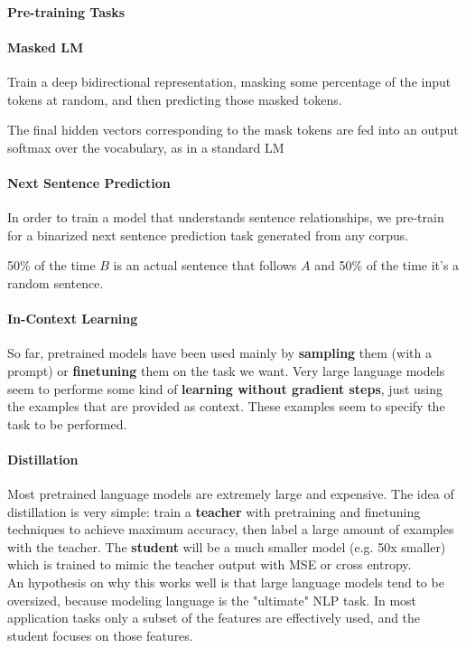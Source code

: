 \documentclass[10pt]{report}
\begin{document}
\paragraph{Pre-training Tasks}
\begin{multicols}{2}
	\paragraph{Masked LM}\begin{list}{}{}
		\item Train a deep bidirectional representation, masking some percentage of the input tokens at random, and then predicting those masked tokens.
		\item The final hidden vectors corresponding to the mask tokens are fed into an output softmax over the vocabulary, as in a standard LM
	\end{list}
	\columnbreak
	\paragraph{Next Sentence Prediction}\begin{list}{}{}
		\item In order to train a model that understands sentence relationships, we pre-train for a binarized next sentence prediction task generated from any corpus.
		\item 50\% of the time $B$ is an actual sentence that follows $A$ and 50\% of the time it's a random sentence.
	\end{list}
\end{multicols}
\paragraph{In-Context Learning} So far, pretrained models have been used mainly by \textbf{sampling} them (with a prompt) or \textbf{finetuning} them on the task we want. Very large language models seem to performe some kind of \textbf{learning without gradient steps}, just using the examples that are provided as context. These examples seem to specify the task to be performed.
\paragraph{Distillation} Most pretrained language models are extremely large and expensive. The idea of distillation is very simple: train a \textbf{teacher} with pretraining and finetuning techniques to achieve maximum accuracy, then label a large amount of examples with the teacher. The \textbf{student} will be a much smaller model (e.g. 50x smaller) which is trained to mimic the teacher output with MSE or cross entropy.\\
An hypothesis on why this works well is that large language models tend to be oversized, because modeling language is the "ultimate" NLP task. In most application tasks only a subset of the features are effectively used, and the student focuses on those features.
\pagebreak
\end{document}
